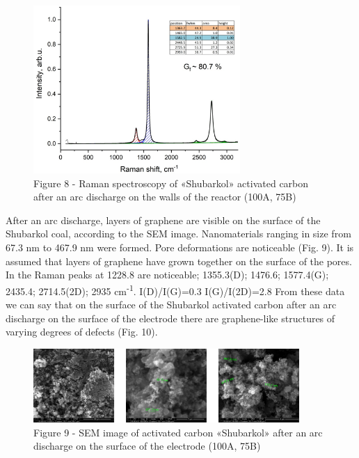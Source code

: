 \begin{figure}[H]
	\centering
	\includegraphics[width=0.7\textwidth]{assets/60}
	\caption*{Figure 8 - Raman spectroscopy of «Shubarkol» activated carbon after an arc discharge on the walls of the reactor (100A, 75B)}
\end{figure}

\begin{multicols}{2}
After an arc discharge, layers of graphene are visible on the surface of
the Shubarkol coal, according to the SEM image. Nanomaterials ranging in
size from 67.3 nm to 467.9 nm were formed. Pore
\hspace{0pt}\hspace{0pt}deformations are noticeable (Fig. 9). It is
assumed that layers of graphene have grown together on the surface of
the pores. In the Raman peaks at 1228.8 are noticeable; 1355.3(D);
1476.6; 1577.4(G); 2435.4; 2714.5(2D); 2935 cm\textsuperscript{-1}.
I(D)/I(G)=0.3 I(G)/I(2D)=2.8 From these data we can say that on the
surface of the Shubarkol activated carbon after an arc discharge on the
surface of the electrode there are graphene-like structures of varying
degrees of defects (Fig. 10).
\end{multicols}

\begin{figure}[H]
	\centering
	\includegraphics[width=0.9\textwidth]{assets/61}
	\caption*{Figure 9 - SEM image of activated carbon «Shubarkol» after an arc discharge on the surface of the electrode (100A, 75B)}
\end{figure}

